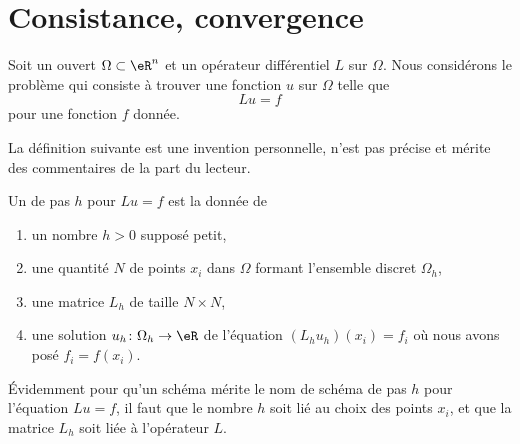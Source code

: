 \section{Consistance, convergence}

Soit un ouvert \( \Omega\subset \eR^n\) et un opérateur différentiel \( L\) sur \( \Omega\). Nous considérons le problème qui consiste à trouver une fonction \( u\) sur \( \Omega\) telle que
\begin{equation}
    Lu=f
\end{equation}
pour une fonction \( f\) donnée.

\begin{probleme}
    La définition suivante est une invention personnelle, n'est pas précise et mérite des commentaires de la part du lecteur.
\end{probleme}
\begin{definition}
    Un  de pas \( h\) pour \( Lu=f\) est la donnée de
    \begin{enumerate}
        \item
            un nombre \( h>0\) supposé petit,
        \item
            une quantité \( N\) de points \( x_i \) dans \( \Omega\) formant l'ensemble discret \( \Omega_h\),
        \item
            une matrice \( L_h\) de taille \( N\times N\),
        \item
            une solution \( u_h\colon \Omega_h\to \eR\) de l'équation \( (L_hu_h)(x_i)=f_i\) où nous avons posé \( f_i=f(x_i)\).
    \end{enumerate}
\end{definition}

Évidemment pour qu'un schéma mérite le nom de schéma de pas \( h\) pour l'équation \( Lu=f\), il faut que le nombre \( h\) soit lié au choix des points \( x_i\), et que la matrice \( L_h\) soit liée à l'opérateur \( L\).

